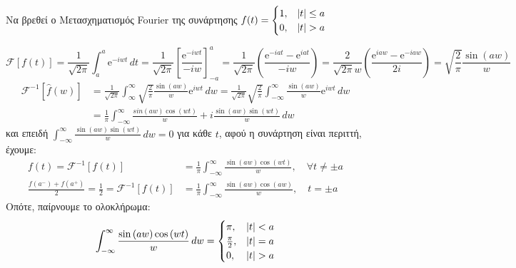 \begin{example}
  Να βρεθεί ο Μετασχηματισμός Fourier της συνάρτησης 
  $ f(t) = 
  \begin{cases}
    1, & \abs{t} \leq a \\
    0, & \abs{t} > a
  \end{cases}$
\end{example}
\begin{solution}
  \[ 
    \mathcal{F}[f(t)] = \frac{1}{\sqrt{2 \pi}} \int _{a}^{a} \mathrm{e}^{-iwt} \,{dt} =
    \frac{1}{\sqrt{2 \pi}} \left[\frac{\mathrm{e}^{-iwt}}{-iw} \right]_{-a}^{a} = 
    \frac{1}{\sqrt{2 \pi}} \left(\frac{\mathrm{e}^{-iat} - \mathrm{e}^{iat}}{-iw}\right) 
    = \frac{2}{\sqrt{2 \pi} w} \left(\frac{\mathrm{e}^{iaw} -
    \mathrm{e}^{-iaw}}{2i}\right) = \sqrt{\frac{2}{\pi}} \frac{\sin{(aw)}}{w}
  \]
  \begin{align*}
    \mathcal{F^{-1}}[\hat{f} (w)] 
    &= \frac{1}{\sqrt{2 \pi}} \int _{\infty}^{\infty}
    \sqrt{\frac{2}{\pi}} \frac{\sin{(aw)}}{w} \mathrm{e}^{iwt} \,{dw} =
    \frac{1}{\sqrt{2 \pi}} \sqrt{\frac{2}{\pi}} \int _{- \infty}^{\infty}
    \frac{\sin{(aw)}}{w} \mathrm{e}^{iwt} \,{dw} \\ 
    &= \frac{1}{\pi} \int _{- \infty}^{\infty} \frac{sin(aw) \cos{(wt)}}{w} + i 
    \frac{\sin{(aw)} \sin{(wt)}}{w} \,{dw} 
  \end{align*} 
  και επειδή $ \int _{- \infty}^{\infty} \frac{\sin{(aw)} \sin{(wt)}}{w} \,{dw} = 0 $ 
  για κάθε $t$, αφού η συνάρτηση είναι περιττή, έχουμε:
  \begin{align*}
    f(t) = \mathcal{F^{-1}}[f(t)] &= \frac{1}{\pi} 
    \int _{-\infty}^{\infty}\frac{\sin{(aw)} \cos{(wt)}}{w}, \quad \forall t \neq \pm a 
    \\
    \frac{f(a^{-})+f(a^{+})}{2} = \frac{1}{2} = \mathcal{F^{-1}}[f(t)] &= \frac{1}{\pi} 
    \int _{-\infty}^{\infty}\frac{\sin{(aw)} \cos{(aw)}}{w}, \quad t= \pm a
  \end{align*} 
  Οπότε, παίρνουμε το ολοκλήρωμα:
  \[
    \int _{- \infty}^{\infty} \frac{\sin{(aw)} \cos{(wt)}}{w} \,{dw} = 
    \begin{cases}
      \pi, & \abs{t} < a \\
      \frac{\pi}{2}, & \abs{t} = a \\
      0, & \abs{t} > a
    \end{cases}
  \] 
\end{solution}

